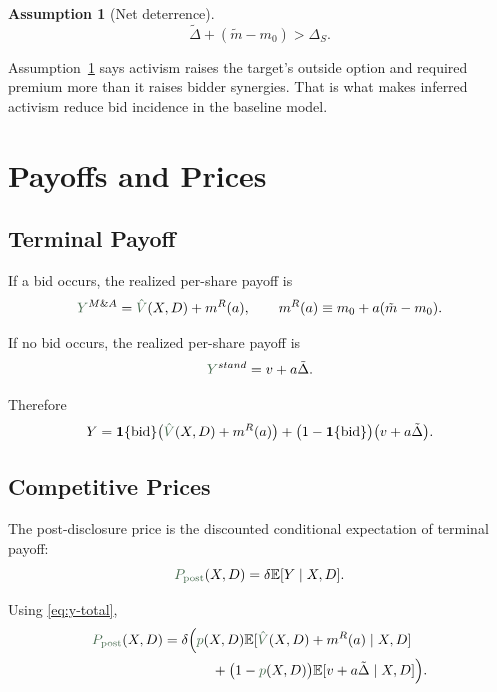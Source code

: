 \documentclass[11pt,a4paper]{article}
\theoremstyle{definition}
\newtheorem{assumption}{Assumption}[section]
\theoremstyle{plain}
\theoremstyle{remark}
\newcommand{\E}{\mathbb{E}}
\newcommand{\1}{\mathbf{1}}
\newcommand{\outcome}[1]{{\color{ForestGreen!50!black}#1}}
\begin{document}
\begin{assumption}[Net deterrence]
\label{ass:deterrence}
\[
\tilde{\Delta} + (\tilde m-m_0) > \Delta_S.
\]
\end{assumption}

\begin{econbox}
Assumption~\ref{ass:deterrence} says activism raises the target's outside option and required premium more than it raises bidder synergies. That is what makes inferred activism reduce bid incidence in the baseline model.
\end{econbox}

\section{Payoffs and Prices}

\subsection{Terminal Payoff}

If a bid occurs, the realized per-share payoff is
\begin{equation}
\outcome{Y}^{M\&A}
=
\outcome{\hat V}(X,D) + m^R(a),
\qquad
m^R(a) \equiv m_0 + a(\tilde m-m_0).
\label{eq:y-ma}
\end{equation}

If no bid occurs, the realized per-share payoff is
\begin{equation}
\outcome{Y}^{stand} = v + a\tilde{\Delta}.
\label{eq:y-stand}
\end{equation}

Therefore
\begin{equation}
Y
=
\1\{\text{bid}\}\big(\outcome{\hat V}(X,D)+m^R(a)\big)
+
\big(1-\1\{\text{bid}\}\big)\big(v+a\tilde{\Delta}\big).
\label{eq:y-total}
\end{equation}

\subsection{Competitive Prices}

The post-disclosure price is the discounted conditional expectation of terminal payoff:
\begin{equation}
\outcome{P_{\textup{post}}}(X,D)
=
\delta \E[Y\mid X,D].
\label{eq:ppost-def}
\end{equation}

Using \eqref{eq:y-total},
\begin{align}
\outcome{P_{\textup{post}}}(X,D)
&=
\delta \Big(
\outcome{p}(X,D)\E[\outcome{\hat V}(X,D)+m^R(a)\mid X,D] \nonumber\\
&\hspace{3.5em}
+ \big(1-\outcome{p}(X,D)\big)\E[v+a\tilde{\Delta}\mid X,D]
\Big).
\label{eq:ppost-step1}
\end{align}
\end{document}
